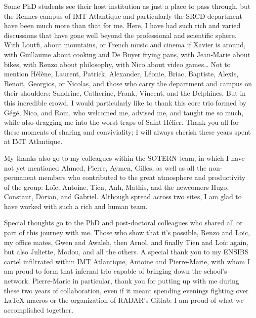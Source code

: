 Some PhD students see their host institution as just a place to pass through, but the Rennes campus of IMT Atlantique and particularly the SRCD department have been much more than that for me.
Here, I have had such rich and varied discussions that have gone well beyond the professional and scientific sphere.
With Loutfi, about mountains, or French music and cinema if Xavier is around, with Guillaume about cooking and De Buyer frying pans, with Jean-Marie about bikes, with Renzo about philosophy, with Nico about video games\dots{}
Not to mention Hélène, Laurent, Patrick, Alexander, Léonie, Briac, Baptiste, Alexis, Benoit, Georgios, or Nicolas, and those who carry the department and campus on their shoulders: Sandrine, Catherine, Frank, Vincent, and the Delphines.
But in this incredible crowd, I would particularly like to thank this core trio formed by Gégé, Nico, and Rom, who welcomed me, advised me, and taught me so much, while also dragging me into the worst traps of Saint-Hélier.
Thank you all for these moments of sharing and conviviality; I will always cherish these years spent at IMT Atlantique.

My thanks also go to my colleagues within the SOTERN team, in which I have not yet mentioned Ahmed, Pierre, Aymen, Gilles, as well as all the non-permanent members who contributed to the great atmosphere and productivity of the group: Loïc, Antoine, Tien, Anh, Mathis, and the newcomers Hugo, Constant, Dorian, and Gabriel.
Although spread across two sites, I am glad to have worked with such a rich and human team.

Special thoughts go to the PhD and post-doctoral colleagues who shared all or part of this journey with me.
Those who show that it's possible, Renzo and Loïc, my office mates, Gwen and Awaleh, then Arnol, and finally Tien and Loïc again, but also Juliette, Modou, and all the others.
A special thank you to my ENSIBS cartel infiltrated within IMT Atlantique, Antoine and Pierre-Marie, with whom I am proud to form that infernal trio capable of bringing down the school's network.
Pierre-Marie in particular, thank you for putting up with me during these two years of collaboration, even if it meant spending evenings fighting over \LaTeX{} macros or the organization of RADAR's Gitlab.
I am proud of what we accomplished together.

